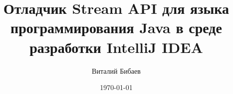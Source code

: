 \documentclass{beamer}
\title[]{Отладчик Stream API для языка программирования Java в среде разработки IntelliJ IDEA} %
\author{Виталий Бибаев} %
\institute[СПБАУ] %
{
Научный руководитель:  Егор Ушаков\\
\medskip
САНКТ-ПЕТЕРБУРГСКИЙ АКАДЕМИЧЕСКИЙ УНИВЕРСИТЕТ \\ %
\medskip
\textit{vitaliy.bibaev@gmail.com} %
}
\date{\today} %
\begin{document}
\begin{frame}
\titlepage %
\end{frame}




%
\end{document}
